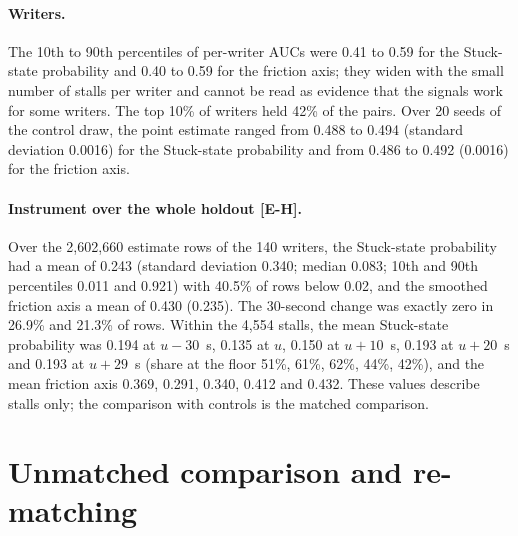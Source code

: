 \paragraph{Writers.} The 10th to 90th percentiles of per-writer AUCs were 0.41 to 0.59 for the Stuck-state probability and
0.40 to 0.59 for the friction axis; they widen with the small number of stalls per writer and cannot be read as evidence
that the signals work for some writers. The top 10\% of writers held 42\% of the pairs. Over 20 seeds of the control
draw, the point estimate ranged from 0.488 to 0.494 (standard deviation 0.0016) for the Stuck-state probability and from
0.486 to 0.492 (0.0016) for the friction axis.

\paragraph{Instrument over the whole holdout [E-H].} Over the 2,602,660 estimate rows of the 140 writers, the
Stuck-state probability had a mean of 0.243 (standard deviation 0.340; median 0.083; 10th and 90th percentiles 0.011 and
0.921) with 40.5\% of rows below 0.02, and the smoothed friction axis a mean of 0.430 (0.235). The 30-second change was exactly zero in 26.9\% and
21.3\% of rows. Within the 4,554 stalls, the mean Stuck-state probability was 0.194 at $u - 30$~s, 0.135 at $u$, 0.150
at $u + 10$~s, 0.193 at $u + 20$~s and 0.193 at $u + 29$~s (share at the floor 51\%, 61\%, 62\%, 44\%, 42\%), and the
mean friction axis 0.369, 0.291, 0.340, 0.412 and 0.432. These values describe stalls only; the comparison with controls
is the matched comparison.

\section{Unmatched comparison and re-matching}
\label{app:unmatched}

